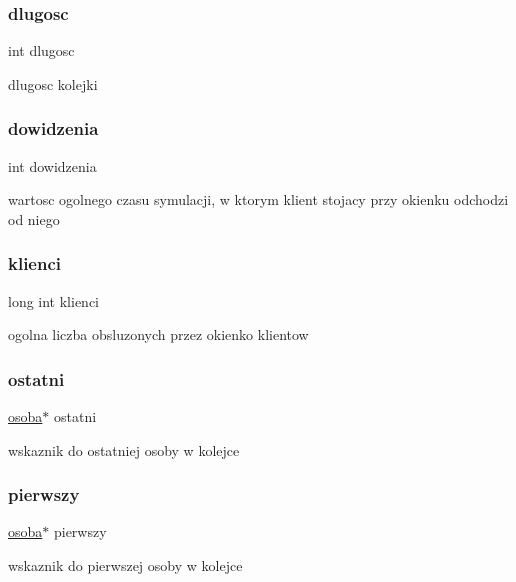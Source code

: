 \subsubsection{\texorpdfstring{dlugosc}{dlugosc}}
{\footnotesize\ttfamily int dlugosc}

dlugosc kolejki \mbox{\label{structkolejka_a1ed9b914e525025c5ac4bdfdfde4ce15}} 
\subsubsection{\texorpdfstring{dowidzenia}{dowidzenia}}
{\footnotesize\ttfamily int dowidzenia}

wartosc ogolnego czasu symulacji, w ktorym klient stojacy przy okienku odchodzi od niego \mbox{\label{structkolejka_a903fe5525d677f3a47dcb4b07cd61864}} 
\subsubsection{\texorpdfstring{klienci}{klienci}}
{\footnotesize\ttfamily long int klienci}

ogolna liczba obsluzonych przez okienko klientow \mbox{\label{structkolejka_a73379228b3b1b4b9e4646f176550df7e}} 
\subsubsection{\texorpdfstring{ostatni}{ostatni}}
{\footnotesize\ttfamily \hyperlink{structosoba}{osoba}$\ast$ ostatni}

wskaznik do ostatniej osoby w kolejce \mbox{\label{structkolejka_a4d248304c78ad2a38974f8c5b71c4c7c}} 
\subsubsection{\texorpdfstring{pierwszy}{pierwszy}}
{\footnotesize\ttfamily \hyperlink{structosoba}{osoba}$\ast$ pierwszy}

wskaznik do pierwszej osoby w kolejce \mbox{\label{structkolejka_a513e21be1be6b9960e90cadd19d49e47}} 

